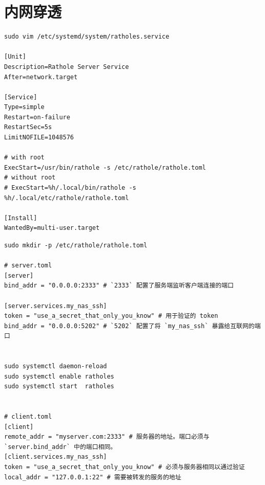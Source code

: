 \section{内网穿透}
\begin{code}[title=Rathole Service]
	\begin{verbatim}
sudo vim /etc/systemd/system/ratholes.service

[Unit]
Description=Rathole Server Service
After=network.target

[Service]
Type=simple
Restart=on-failure
RestartSec=5s
LimitNOFILE=1048576

# with root
ExecStart=/usr/bin/rathole -s /etc/rathole/rathole.toml
# without root
# ExecStart=%h/.local/bin/rathole -s %h/.local/etc/rathole/rathole.toml

[Install]
WantedBy=multi-user.target
    \end{verbatim}
\end{code}

\begin{code}[title=Rathole Toml]
	\begin{verbatim}
sudo mkdir -p /etc/rathole/rathole.toml

# server.toml
[server]
bind_addr = "0.0.0.0:2333" # `2333` 配置了服务端监听客户端连接的端口

[server.services.my_nas_ssh]
token = "use_a_secret_that_only_you_know" # 用于验证的 token
bind_addr = "0.0.0.0:5202" # `5202` 配置了将 `my_nas_ssh` 暴露给互联网的端口


sudo systemctl daemon-reload
sudo systemctl enable ratholes
sudo systemctl start  ratholes


# client.toml
[client]
remote_addr = "myserver.com:2333" # 服务器的地址。端口必须与 `server.bind_addr` 中的端口相同。
[client.services.my_nas_ssh]
token = "use_a_secret_that_only_you_know" # 必须与服务器相同以通过验证
local_addr = "127.0.0.1:22" # 需要被转发的服务的地址
    \end{verbatim}
\end{code}

